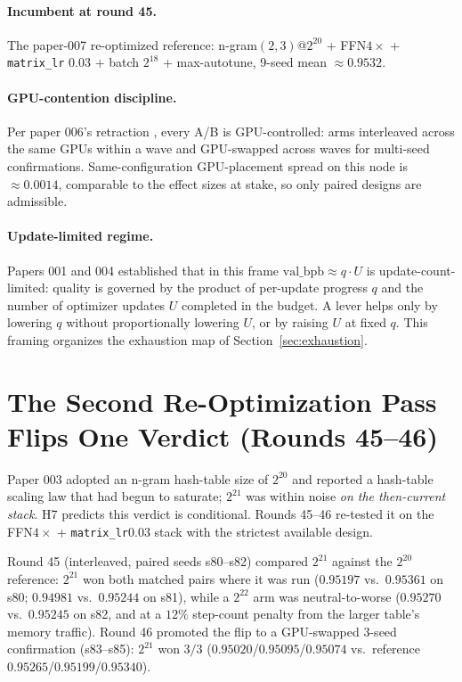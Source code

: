 \documentclass{article}
\newcommand{\valbpb}{\mathrm{val\_bpb}}
\begin{document}
\paragraph{Incumbent at round 45.} The paper-007 re-optimized reference: n-gram$(2,3)$@$2^{20}$ + FFN$4\times$ + \texttt{matrix\_lr} $0.03$ + batch $2^{18}$ + max-autotune, 9-seed mean $\approx 0.9532$.

\paragraph{GPU-contention discipline.} Per paper 006's retraction \cite{ophis2026retraction}, every A/B is GPU-controlled: arms interleaved across the same GPUs within a wave and GPU-swapped across waves for multi-seed confirmations. Same-configuration GPU-placement spread on this node is $\approx 0.0014$, comparable to the effect sizes at stake, so only paired designs are admissible.

\paragraph{Update-limited regime.} Papers 001 and 004 established that in this frame $\valbpb \approx q \cdot U$ is update-count-limited: quality is governed by the product of per-update progress $q$ and the number of optimizer updates $U$ completed in the budget. A lever helps only by lowering $q$ without proportionally lowering $U$, or by raising $U$ at fixed $q$. This framing organizes the exhaustion map of Section~\ref{sec:exhaustion}.

\section{The Second Re-Optimization Pass Flips One Verdict (Rounds 45--46)}
\label{sec:secondpass}

Paper 003 \cite{ophis2026ngram} adopted an n-gram hash-table size of $2^{20}$ and reported a hash-table scaling law that had begun to saturate; $2^{21}$ was within noise \emph{on the then-current stack}. H7 predicts this verdict is conditional. Rounds 45--46 re-tested it on the FFN$4\times$ + \texttt{matrix\_lr}$0.03$ stack with the strictest available design.

Round 45 (interleaved, paired seeds s80--s82) compared $2^{21}$ against the $2^{20}$ reference: $2^{21}$ won both matched pairs where it was run ($0.95197$ vs.\ $0.95361$ on s80; $0.94981$ vs.\ $0.95244$ on s81), while a $2^{22}$ arm was neutral-to-worse ($0.95270$ vs.\ $0.95245$ on s82, and at a $12\%$ step-count penalty from the larger table's memory traffic). Round 46 promoted the flip to a GPU-swapped 3-seed confirmation (s83--s85): $2^{21}$ won $3/3$ ($0.95020$/$0.95095$/$0.95074$ vs.\ reference $0.95265$/$0.95199$/$0.95340$).
\end{document}
